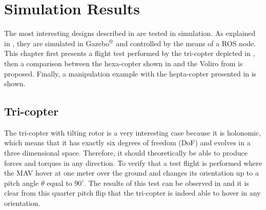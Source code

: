 \chapter{Simulation Results}
\label{sec:simulation_results}

The most interesting designs described in  are
tested in simulation. As explained in , they are simulated in
Gazebo$^\textrm{\textregistered}$ and controlled by the means of a ROS node.
This chapter first presents a flight test performed by the tri-copter depicted in
, then a comparison between the hexa-copter shown in
 and the Voliro from \citep{kamel_voliro:_2018}
is proposed. Finally, a manipulation example with the hepta-copter
presented in  is shown.

\section{Tri-copter}
\label{sec:tri_copter_sim}

The tri-copter with tilting rotor is a very interesting case because it is holonomic,
which means that it has exactly six degrees of freedom (DoF) and evolves in a
three dimensional space. Therefore, it should theoretically be able to produce forces
and torques in any direction. To verify that a test flight is performed where the MAV
hover at one meter over the ground and changes its orientation up to a pitch angle
$\theta$ equal to $90^{\circ}$. The results of this test can be observed in
 and it is clear from this quarter pitch flip that the tri-copter
is indeed able to hover in any orientation.\\

